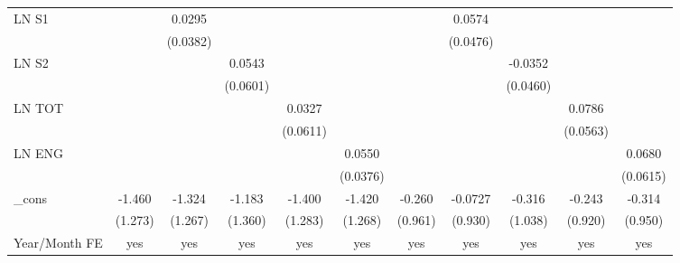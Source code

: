 \begin{table}[htbp]
\begin{tabular}{l*{10}{c}}
LN S1           &                  &   0.0295         &                  &                  &                  &                  &   0.0574         &                  &                  &                  \\
                &                  & (0.0382)         &                  &                  &                  &                  & (0.0476)         &                  &                  &                  \\
LN S2           &                  &                  &   0.0543         &                  &                  &                  &                  &  -0.0352         &                  &                  \\
                &                  &                  & (0.0601)         &                  &                  &                  &                  & (0.0460)         &                  &                  \\
LN TOT          &                  &                  &                  &   0.0327         &                  &                  &                  &                  &   0.0786         &                  \\
                &                  &                  &                  & (0.0611)         &                  &                  &                  &                  & (0.0563)         &                  \\
LN ENG          &                  &                  &                  &                  &   0.0550         &                  &                  &                  &                  &   0.0680         \\
                &                  &                  &                  &                  & (0.0376)         &                  &                  &                  &                  & (0.0615)         \\
\_cons          &   -1.460         &   -1.324         &   -1.183         &   -1.400         &   -1.420         &   -0.260         &  -0.0727         &   -0.316         &   -0.243         &   -0.314         \\
                &  (1.273)         &  (1.267)         &  (1.360)         &  (1.283)         &  (1.268)         &  (0.961)         &  (0.930)         &  (1.038)         &  (0.920)         &  (0.950)         \\
\hline
Year/Month FE   &      yes         &      yes         &      yes         &      yes         &      yes         &      yes         &      yes         &      yes         &      yes         &      yes         \\

\end{tabular}
\end{table}
